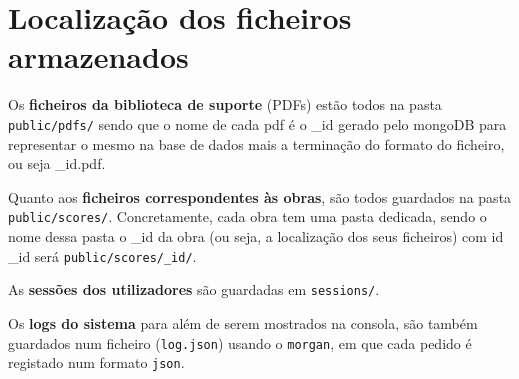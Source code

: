 \section{Localização dos ficheiros armazenados}\label{c:localFichs}

\qquad Os \textbf{ficheiros da biblioteca de suporte} (PDFs) estão todos na pasta \verb|public/pdfs/| sendo que o nome de cada pdf é o \_id gerado pelo mongoDB para representar o mesmo na base de dados mais a terminação do formato do ficheiro, ou seja \_id.pdf.  

Quanto aos \textbf{ficheiros correspondentes às obras}, são todos guardados na pasta \verb|public/scores/|. Concretamente, cada obra tem uma pasta dedicada, sendo o nome dessa pasta o \_id da obra (ou seja, a localização dos seus ficheiros) com id \_id será \verb|public/scores/_id/|. 

As \textbf{sessões dos utilizadores} são guardadas em \verb|sessions/|. 

Os \textbf{logs do sistema} para além de serem mostrados na consola, são também guardados num ficheiro (\texttt{log.json}) usando o \texttt{morgan}, em que cada pedido é registado num formato \texttt{json}.